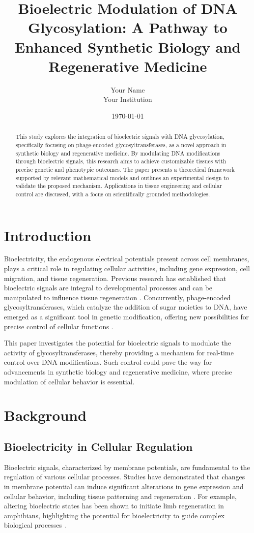 \documentclass[12pt]{article}
\title{Bioelectric Modulation of DNA Glycosylation: A Pathway to Enhanced Synthetic Biology and Regenerative Medicine}
\author{Your Name \\ Your Institution}
\date{\today}
\begin{document}
\maketitle

\begin{abstract}
This study explores the integration of bioelectric signals with DNA glycosylation, specifically focusing on phage-encoded glycosyltransferases, as a novel approach in synthetic biology and regenerative medicine. By modulating DNA modifications through bioelectric signals, this research aims to achieve customizable tissues with precise genetic and phenotypic outcomes. The paper presents a theoretical framework supported by relevant mathematical models and outlines an experimental design to validate the proposed mechanism. Applications in tissue engineering and cellular control are discussed, with a focus on scientifically grounded methodologies.
\end{abstract}

\section{Introduction}
Bioelectricity, the endogenous electrical potentials present across cell membranes, plays a critical role in regulating cellular activities, including gene expression, cell migration, and tissue regeneration. Previous research has established that bioelectric signals are integral to developmental processes and can be manipulated to influence tissue regeneration \cite{levin2019bioelectric}. Concurrently, phage-encoded glycosyltransferases, which catalyze the addition of sugar moieties to DNA, have emerged as a significant tool in genetic modification, offering new possibilities for precise control of cellular functions \cite{pyle2024virus}.

This paper investigates the potential for bioelectric signals to modulate the activity of glycosyltransferases, thereby providing a mechanism for real-time control over DNA modifications. Such control could pave the way for advancements in synthetic biology and regenerative medicine, where precise modulation of cellular behavior is essential.

\section{Background}

\subsection{Bioelectricity in Cellular Regulation}
Bioelectric signals, characterized by membrane potentials, are fundamental to the regulation of various cellular processes. Studies have demonstrated that changes in membrane potential can induce significant alterations in gene expression and cellular behavior, including tissue patterning and regeneration \cite{levin2012reprogrammable}. For example, altering bioelectric states has been shown to initiate limb regeneration in amphibians, highlighting the potential for bioelectricity to guide complex biological processes \cite{adams2016pump}.
\end{document}
